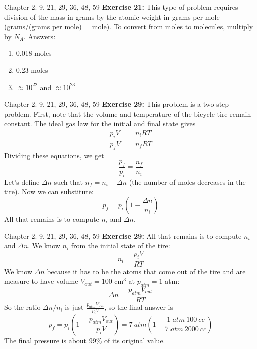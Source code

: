 \documentclass{beamer}
\begin{document}
\begin{frame}{Chapter 2: 9, 21, 29, 36, 48, 59}
\small
\textbf{Exercise 21:} This type of problem requires division of the mass in grams by the atomic weight in grams per mole (grams/(grams per mole) = mole). To convert from moles to molecules, multiply by $N_A$. Answers:
\begin{enumerate}
\item 0.018 moles
\item 0.23 moles
\item $\approx 10^{22}$ and $\approx 10^{23}$
\end{enumerate}
\end{frame}

\begin{frame}{Chapter 2: 9, 21, 29, 36, 48, 59}
\small
\textbf{Exercise 29:} This problem is a two-step problem.  First, note that the volume and temperature of the bicycle tire remain constant.  The ideal gas law for the initial and final state gives
\begin{align}
p_iV &= n_i R T \\
p_fV &= n_f R T
\end{align}
Dividing these equations, we get
\begin{equation}
\frac{p_f}{p_i} = \frac{n_f}{n_i}
\end{equation}
Let's define $\Delta n$ such that $n_f = n_i -\Delta n$ (the number of moles decreases in the tire).  Now we can substitute:
\begin{equation}
p_f = p_i\left(1-\frac{\Delta n}{n_i}\right)
\end{equation}
All that remains is to compute $n_i$ and $\Delta n$.
\end{frame}

\begin{frame}{Chapter 2: 9, 21, 29, 36, 48, 59}
\small
\textbf{Exercise 29:} All that remains is to compute $n_i$ and $\Delta n$. We know $n_i$ from the initial state of the tire:
\begin{equation}
n_i = \frac{p_iV}{RT}
\end{equation}
We know $\Delta n$ because it has to be the atoms that come out of the tire and are measure to have volume $V_{out}=100$ cm$^3$ at $p_{atm} = 1$ atm:
\begin{equation}
\Delta n = \frac{p_{atm}V_{out}}{RT}
\end{equation}
So the ratio $\Delta n/n_i$ is just $\frac{p_{atm}V_{out}}{p_iV}$, so the final answer is
\begin{equation}
p_f = p_i\left(1-\frac{p_{atm}V_{out}}{p_iV}\right) = 7~atm \left(1-\frac{1~atm~100~cc}{7~atm~2000~cc}\right)
\end{equation}
The final pressure is about 99\% of its original value.
\end{frame}
\end{document}
